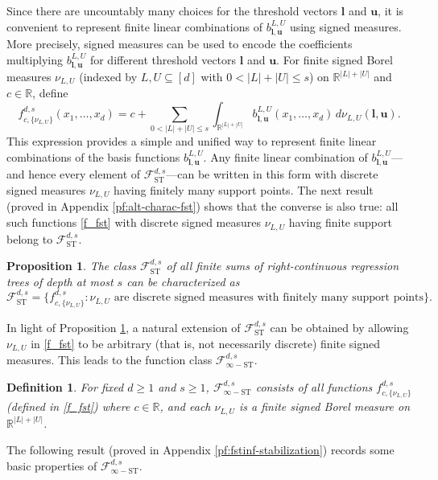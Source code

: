 \documentclass[10pt]{article}
\newtheorem{proposition}{Proposition}
\newtheorem{definition}{Definition}
\newcommand{\R}{{\mathbb R}}
\newcommand{\fst}{{\mathcal{F}^{d, s}_{\text{ST}}}}
\newcommand{\fstinf}{{\mathcal{F}^{d, s}_{\infty-\text{ST}}}}
\newcommand{\fcnu}{{f^{d, s}_{c, \{\nu_{L, U}\}}}}
\newcommand{\lbf}{{\mathbf{l}}}
\newcommand{\ubf}{{\mathbf{u}}}
\begin{document}
Since there are uncountably many choices for the threshold vectors 
$\lbf$ and $\ubf$, it is convenient to represent finite linear 
combinations of $b^{L, U}_{\lbf, \ubf}$ using signed measures. 
More precisely, signed measures can be used to encode the 
coefficients multiplying $b^{L, U}_{\lbf, \ubf}$ for different 
threshold vectors $\lbf$ and $\ubf$. For finite signed Borel
measures $\nu_{L, U}$ (indexed by $L, U \subseteq [d]$ with 
$0 < |L| + |U| \le s$) on $\R^{|L| + |U|}$ and $c \in \R$, define 
\begin{equation}\label{f_fst}
    \fcnu(x_1, \dots, x_d) 
    = c + \sum_{0 < |L| + |U| \le s} \int_{\R^{|L| + |U|}} 
    b^{L, U}_{\lbf, \ubf}(x_1, \dots, x_d) \, d\nu_{L, U}(\lbf, \ubf).
\end{equation}
This expression provides a simple and unified way to represent
finite linear combinations of the basis functions 
$b^{L, U}_{\lbf, \ubf}$. Any finite linear combination of 
$b^{L, U}_{\lbf, \ubf}$—and hence every element of $\fst$—can be 
written in this form with discrete signed measures $\nu_{L, U}$ 
having finitely many support points. The next result 
(proved in Appendix \ref{pf:alt-charac-fst})
shows that the converse is also true: all such functions 
\eqref{f_fst} with discrete signed measures $\nu_{L, U}$ having 
finite support belong to $\fst$.

\begin{proposition}\label{prop:alt-charac-fst}
    The class $\fst$ of all finite sums of right-continuous 
    regression trees of depth at most $s$ can be characterized as 
    \begin{equation*}
        \fst = \big\{\fcnu: \nu_{L, U} \text{ are discrete signed 
        measures with finitely many support points}\big\}.
    \end{equation*}
\end{proposition}

In light of Proposition \ref{prop:alt-charac-fst}, a natural 
extension of $\fst$ can be obtained by allowing $\nu_{L, U}$ in 
\eqref{f_fst} to be arbitrary (that is, not necessarily discrete) 
finite signed measures. This leads to the function class $\fstinf$.
\begin{definition}
For fixed $d \ge 1$ and $s \ge 1$, $\fstinf$ consists of all 
functions $\fcnu$ (defined in \eqref{f_fst}) where $c \in \R$, and 
each $\nu_{L, U}$ is a finite signed Borel measure on $\R^{|L|+|U|}$.
\end{definition}
The following result (proved in Appendix \ref{pf:fstinf-stabilization}) 
records some basic properties of $\fstinf$.
\end{document}
